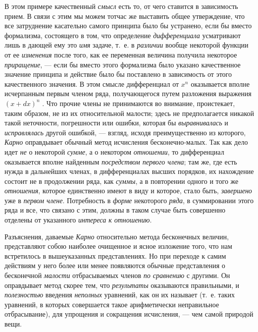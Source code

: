 В этом примере качественный {\em смысл} есть то, от чего
ставится в зависимость прием. В связи с этим мы можем тотчас же выставить
общее утверждение, что все затруднение касательно самого принципа было бы
устранено, если бы вместо формализма, состоящего в том, что определение
{\em дифференциала} усматривают лишь в дающей ему это
{\em имя} задаче, т.~е. в
{\em различии} вообще некоторой функции от ее
{\em изменения} после того, как ее переменная величина
получила некоторое {\em приращение}, — если бы вместо
этого формализма было указано качественное значение принципа и действие
было бы поставлено в зависимость от этого качественного значения. В этом
смысле дифференциал от  $x^n$  оказывается вполне исчерпанным первым членом
ряда, получающегося путем разложения выражения  $(x+\mathit{dx})^n$ . Что
прочие члены не принимаются во внимание, проистекает, таким образом, не из
их относительной малости; здесь не предполагается никакой такой неточности,
погрешности или ошибки, которая бы {\em выравнивалась}
и {\em исправлялась} другой ошибкой, — взгляд, исходя
преимущественно из которого, {\em Карно} оправдывает
обычный метод исчисления бесконечно-малых. Так как дело идет
{\em не} о некоторой {\em сумме}, а
о некотором {\em отношении}, то дифференциал оказывается
вполне найденным {\em посредством первого члена}; там
же, где есть нужда в дальнейших членах, в дифференциалах высших порядков, их
нахождение состоит не в продолжении ряда, как
{\em суммы}, а в повторении одного и того же
{\em отношения}, которое единственно имеют в виду и
которое, стало быть, {\em завершено} уже в
{\em первом члене}. Потребность в
{\em форме} некоторого {\em ряда},
в суммировании этого ряда и все, что связано с этим, должны в таком случае
быть совершенно отделены от указанного {\em интереса к
отношению}.

Разъяснения, даваемые {\em Карно} относительно метода
бесконечных величин, представляют собою наиболее очищенное и ясное
изложение того, что нам встретилось в вышеуказанных представлениях. Но при
переходе к самим действиям у него более или менее появляются обычные
представления о бесконечной {\em малости} отбрасываемых
членов {\em по сравнению} с другими. Он оправдывает
метод скорее тем, что {\em результаты} оказываются
правильными, и {\em полезностью} введения
{\em неполных} уравнений, как он их называет (т.~е.
таких уравнений, в которых совершается такое арифметически неправильное
отбрасывание), для упрощения и сокращения исчисления, — чем самой природой
вещи.

